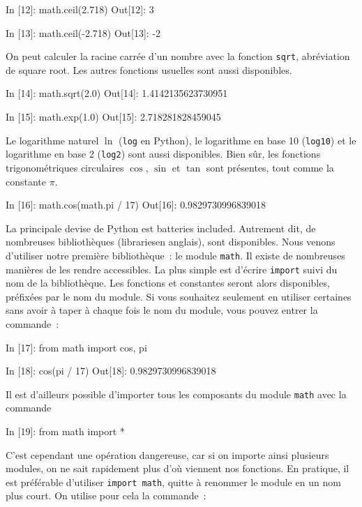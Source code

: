 \documentclass{magnoliaold}
\begin{document}
\begin{pythoncode}
In [12]: math.ceil(2.718)
Out[12]: 3

In [13]: math.ceil(-2.718)
Out[13]: -2
\end{pythoncode}

On peut calculer la racine carrée d'un nombre avec la fonction \verb_sqrt_,
abréviation de \og square root\fg. Les autres fonctions usuelles sont aussi disponibles.

\begin{pythoncode}
In [14]: math.sqrt(2.0)
Out[14]: 1.4142135623730951

In [15]: math.exp(1.0)
Out[15]: 2.718281828459045
\end{pythoncode}

\noindent Le logarithme naturel $\ln$ (\verb_log_ en Python), le logarithme en base 10 (\verb_log10_) et
le logarithme en base 2 (\verb_log2_) sont aussi disponibles. Bien sûr, les fonctions
trigonométriques circulaires $\cos$, $\sin$ et $\tan$ sont présentes, tout comme la
constante $\pi$.

\begin{pythoncode}
In [16]: math.cos(math.pi / 17)
Out[16]: 0.9829730996839018
\end{pythoncode}

La principale devise de Python est \og batteries included\fg. Autrement dit,
de nombreuses bibliothèques (\og libraries\fg en anglais), sont disponibles. Nous
venons d'utiliser notre première bibliothèque~: le module \verb_math_. Il existe de
nombreuses manières de les rendre accessibles. La plus simple est d'écrire \verb_import_
suivi du nom de la bibliothèque. Les fonctions et constantes seront alors disponibles,
préfixées par le nom du module. Si vous souhaitez seulement en utiliser certaines sans
avoir à taper à chaque fois le nom du module, vous pouvez entrer la commande~:

\begin{pythoncode}
In [17]: from math import cos, pi

In [18]: cos(pi / 17)
Out[18]: 0.9829730996839018
\end{pythoncode}

\noindent Il est d'ailleurs possible d'importer tous les composants du module \verb!math! avec la commande

\begin{pythoncode}
In [19]: from math import *
\end{pythoncode}

\noindent
C'est cependant une opération dangereuse, car si on importe ainsi plusieurs modules, on ne sait rapidement plus
d'où viennent nos fonctions. En pratique, il est préférable d'utiliser \verb!import math!, quitte
à renommer le module en un nom plus court. On utilise pour cela la commande~:
\end{document}
